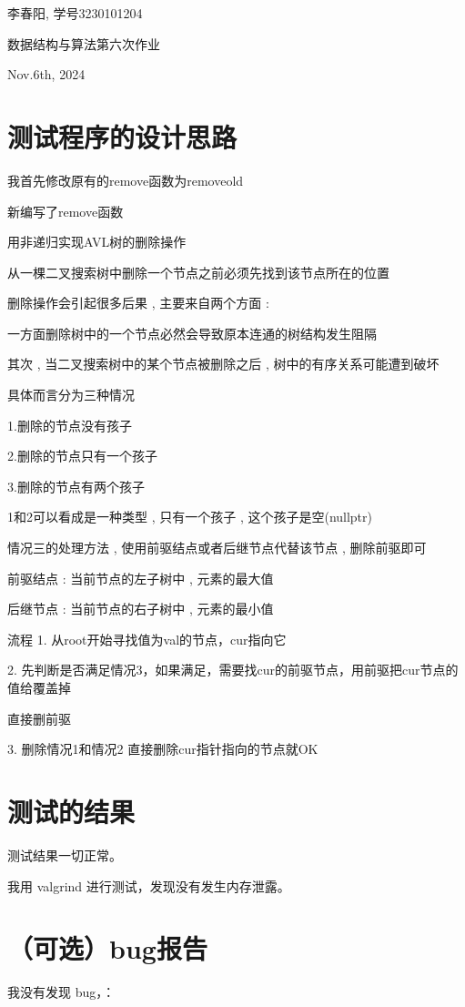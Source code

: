 \documentclass[UTF8]{ctexart}
\begin{document}
李春阳, 学号3230101204

{数据结构与算法第六次作业}

Nov.6th, 2024

\section{测试程序的设计思路}

我首先修改原有的remove函数为removeold

新编写了remove函数

用非递归实现AVL树的删除操作

从一棵二叉搜索树中删除一个节点之前必须先找到该节点所在的位置

	删除操作会引起很多后果 , 主要来自两个方面 :
    
	一方面删除树中的一个节点必然会导致原本连通的树结构发生阻隔
    
	其次 , 当二叉搜索树中的某个节点被删除之后 , 树中的有序关系可能遭到破坏
    
    具体而言分为三种情况
    
	1.删除的节点没有孩子
    
	2.删除的节点只有一个孩子
    
	3.删除的节点有两个孩子
    
	1和2可以看成是一种类型 , 只有一个孩子 , 这个孩子是空(nullptr)
    
	情况三的处理方法 , 使用前驱结点或者后继节点代替该节点 , 删除前驱即可
    
	前驱结点 : 当前节点的左子树中 , 元素的最大值
    
	后继节点 : 当前节点的右子树中 , 元素的最小值
    
流程
1. 从root开始寻找值为val的节点，cur指向它

2. 先判断是否满足情况3，如果满足，需要找cur的前驱节点，用前驱把cur节点的值给覆盖掉

直接删前驱

3. 删除情况1和情况2   直接删除cur指针指向的节点就OK
\section{测试的结果}

测试结果一切正常。

我用 valgrind 进行测试，发现没有发生内存泄露。

\section{（可选）bug报告}

我没有发现 bug，：
\end{document}
